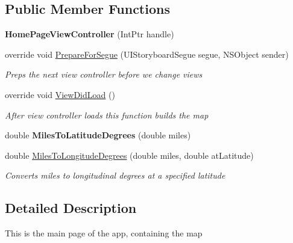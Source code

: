 \subsection*{Public Member Functions}
\begin{DoxyCompactItemize}
\item 
\mbox{\label{class_pinned_app_1_1i_o_s_1_1_home_page_view_controller_ad70a89d24674ad602492185da04faf26}} 
{\bfseries Home\+Page\+View\+Controller} (Int\+Ptr handle)
\item 
override void \hyperlink{class_pinned_app_1_1i_o_s_1_1_home_page_view_controller_a8e788965f6ddef8ff452fa2472003c59}{Prepare\+For\+Segue} (U\+I\+Storyboard\+Segue segue, N\+S\+Object sender)
\begin{DoxyCompactList}\small\item\em Preps the next view controller before we change views \end{DoxyCompactList}\item 
override void \hyperlink{class_pinned_app_1_1i_o_s_1_1_home_page_view_controller_a055c6788c930eb678250ee9afb522c2a}{View\+Did\+Load} ()
\begin{DoxyCompactList}\small\item\em After view controller loads this function builds the map \end{DoxyCompactList}\item 
\mbox{\label{class_pinned_app_1_1i_o_s_1_1_home_page_view_controller_a4959c982dd35a8b24ff1e41f48387c0c}} 
double {\bfseries Miles\+To\+Latitude\+Degrees} (double miles)
\item 
double \hyperlink{class_pinned_app_1_1i_o_s_1_1_home_page_view_controller_a974929f95599b4eee2ffac0f8d34d4db}{Miles\+To\+Longitude\+Degrees} (double miles, double at\+Latitude)
\begin{DoxyCompactList}\small\item\em Converts miles to longitudinal degrees at a specified latitude \end{DoxyCompactList}\end{DoxyCompactItemize}


\subsection{Detailed Description}
This is the main page of the app, containing the map 



